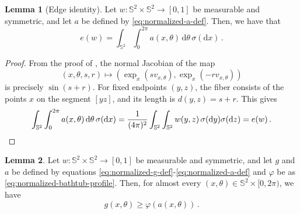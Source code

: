 \documentclass[reqno, 11pt]{amsart}
\theoremstyle{definition}
\newtheorem{lemma}{Lemma}
\newcommand{\dd}{\mathrm{d}}
\begin{document}
\begin{lemma}[Edge identity]\label{lem:incidence-identity-main}
Let \(w:{\mathbb S}^2\times{\mathbb S}^2\to[0,1]\) be measurable and symmetric, and let \(a\) be defined by \eqref{eq:normalized-a-def}.  Then, we have that
\[
        e(w)=\int_{{\mathbb S}^2}\int_0^{2\pi}a(x,\theta)\,\dd\theta\,\sigma(\dd x)\,.
\]
\end{lemma}

\begin{proof}
From the proof of , the normal Jacobian of the map
\[
        (x,\theta,s,r)\longmapsto
        \left(\exp_x(sv_{x,\theta}),\exp_x(-rv_{x,\theta})\right)
\]
is precisely \(\sin(s+r)\).  For fixed endpoints \((y,z)\), the fiber consists of the points \(x\) on the segment \([yz]\), and its length is \(d(y,z)=s+r\).  This gives
\begin{equation*}\int_{{\mathbb S}^2}\int_0^{2\pi}a(x,\theta)\,\dd\theta\,\sigma(\dd x)=
        \frac1{(4\pi)^2}
        \int_{{\mathbb S}^2}\int_{{\mathbb S}^2}w(y,z)\,\sigma(\dd y)\sigma(\dd z)=e(w)\,.
        \qedhere 
\end{equation*}
\end{proof}
\begin{lemma}\label{lem:spherical-pointwise-inequality}
Let \(w:{\mathbb S}^2\times{\mathbb S}^2\to[0,1]\) be measurable and symmetric, and let \(g\) and $a$ be defined by equations \eqref{eq:normalized-g-def}-\eqref{eq:normalized-a-def} and $\varphi$ be as  \eqref{eq:normalized-bathtub-profile}. Then, for almost every \((x,\theta) \in {\mathbb S}^2 \times [0,2\pi)\), we have
\begin{equation*}
    g(x,\theta)\geq \varphi(a(x,\theta))\,.
\end{equation*}
\end{lemma}
\end{document}
